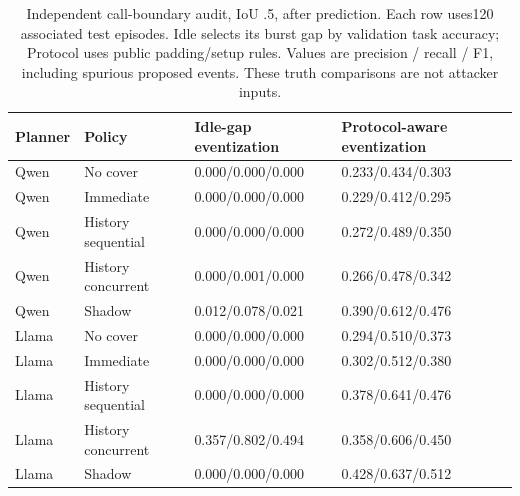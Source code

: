 \begin{table}[t]\centering\small
\caption{Independent call-boundary audit, IoU .5, after prediction. Each row uses120 associated test episodes. Idle selects its burst gap by validation task accuracy; Protocol uses public padding/setup rules. Values are precision / recall / F1, including spurious proposed events. These truth comparisons are not attacker inputs.}\label{tab:no-call-boundaries}
\begin{tabularx}{\textwidth}{@{}llYY@{}}\toprule Planner & Policy & Idle-gap eventization & Protocol-aware eventization \\\midrule
Qwen & No cover & 0.000/0.000/0.000 & 0.233/0.434/0.303 \\
Qwen & Immediate & 0.000/0.000/0.000 & 0.229/0.412/0.295 \\
Qwen & History sequential & 0.000/0.000/0.000 & 0.272/0.489/0.350 \\
Qwen & History concurrent & 0.000/0.001/0.000 & 0.266/0.478/0.342 \\
Qwen & Shadow & 0.012/0.078/0.021 & 0.390/0.612/0.476 \\
Llama & No cover & 0.000/0.000/0.000 & 0.294/0.510/0.373 \\
Llama & Immediate & 0.000/0.000/0.000 & 0.302/0.512/0.380 \\
Llama & History sequential & 0.000/0.000/0.000 & 0.378/0.641/0.476 \\
Llama & History concurrent & 0.357/0.802/0.494 & 0.358/0.606/0.450 \\
Llama & Shadow & 0.000/0.000/0.000 & 0.428/0.637/0.512 \\
\bottomrule\end{tabularx}\end{table}
